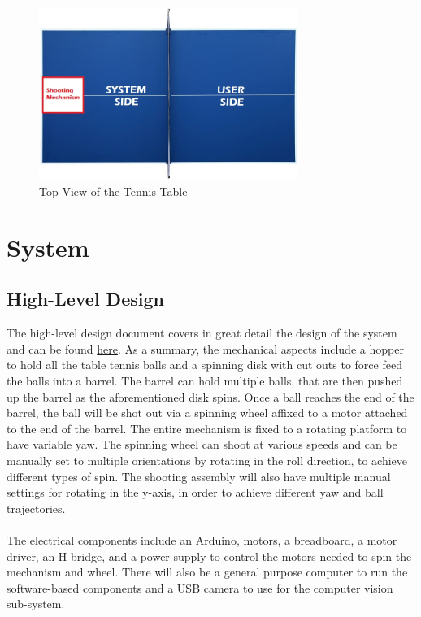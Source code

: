 \documentclass[11pt]{article}
\begin{document}
\begin{figure}[H]
   \centering
   \includegraphics[width=0.75\textwidth]{img/Table-Tennis-Top-View.png}
   \caption{Top View of the Tennis Table}
   \label{fig:table-tennis-top-view}
\end{figure}

\section{System}
\subsection{High-Level Design}
The high-level design document covers in great detail the design of the system and can be found \href{https://github.com/ChristopherMcDonald/SoftwareTronCapstone/blob/develop/documentation/SystemDesign/Design.pdf}{here}. As a summary, the mechanical aspects include a hopper to hold all the table tennis balls and a spinning disk with cut outs to force feed the balls into a barrel. The barrel can hold multiple balls, that are then pushed up the barrel as the aforementioned disk spins. Once a ball reaches the end of the barrel, the ball will be shot out via a spinning wheel affixed to a motor attached to the end of the barrel. The entire mechanism is fixed to a rotating platform to have variable yaw. The spinning wheel can shoot at various speeds and can be manually set to multiple orientations by rotating in the roll direction, to achieve different types of spin. The shooting assembly will also have multiple manual settings for rotating in the y-axis, in order to achieve different yaw and ball trajectories.  \\ \\
The electrical components include an Arduino, motors, a breadboard, a motor driver, an H bridge, and a power supply to control the motors needed to spin the mechanism and wheel. There will also be a general purpose computer to run the software-based components and a USB camera to use for the computer vision sub-system. 
\end{document}
